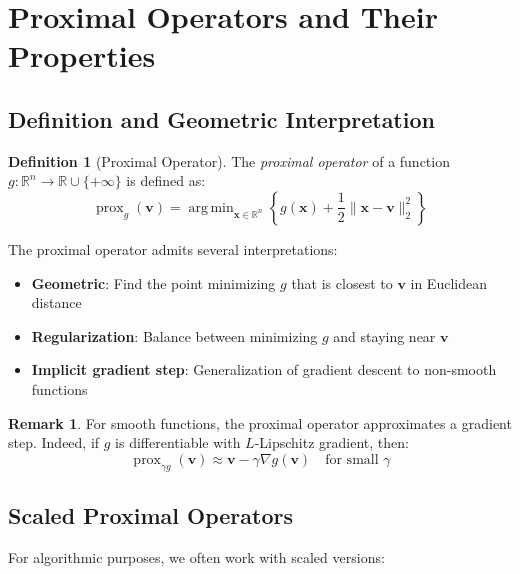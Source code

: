 \documentclass[12pt]{article}
\renewcommand{\vec}[1]{\mathbf{#1}}
\DeclareMathOperator{\argmin}{arg\,min}
\DeclareMathOperator{\prox}{prox}
\newcommand{\norm}[1]{\lVert #1 \rVert}
\newcommand{\R}{\mathbb{R}}
\theoremstyle{definition}
\newtheorem{definition}{Definition}[section]
\newtheorem{remark}{Remark}[section]
\begin{document}
\newpage
\section{Proximal Operators and Their Properties}

\subsection{Definition and Geometric Interpretation}

\begin{definition}[Proximal Operator]\label{def:prox}
    The \textit{proximal operator} of a function $g: \R^n \to \R \cup \{+\infty\}$ is defined as:
    \begin{equation}
        \prox_g(\vec{v}) = \argmin_{\vec{x} \in \R^n} \left\{ g(\vec{x}) + \frac{1}{2}\norm{\vec{x} - \vec{v}}_2^2 \right\}
    \end{equation}
\end{definition}

The proximal operator admits several interpretations:
\begin{itemize}[leftmargin=*]
    \item \textbf{Geometric}: Find the point minimizing $g$ that is closest to $\vec{v}$ in Euclidean distance
    \item \textbf{Regularization}: Balance between minimizing $g$ and staying near $\vec{v}$
    \item \textbf{Implicit gradient step}: Generalization of gradient descent to non-smooth functions
\end{itemize}

\begin{remark}
    For smooth functions, the proximal operator approximates a gradient step. Indeed, if $g$ is differentiable with $L$-Lipschitz gradient, then:
    \begin{equation}
        \prox_{\gamma g}(\vec{v}) \approx \vec{v} - \gamma \nabla g(\vec{v}) \quad \text{for small } \gamma
    \end{equation}
\end{remark}

\subsection{Scaled Proximal Operators}

For algorithmic purposes, we often work with scaled versions:
\end{document}
